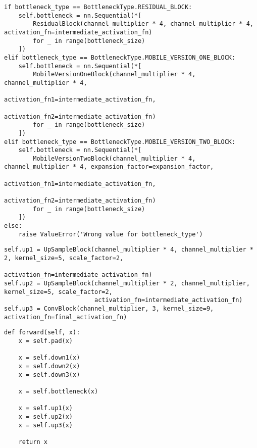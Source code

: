 \begin{listing}[ht]
\begin{verbatim}
if bottleneck_type == BottleneckType.RESIDUAL_BLOCK:
    self.bottleneck = nn.Sequential(*[
        ResidualBlock(channel_multiplier * 4, channel_multiplier * 4, activation_fn=intermediate_activation_fn)
        for _ in range(bottleneck_size)
    ])
elif bottleneck_type == BottleneckType.MOBILE_VERSION_ONE_BLOCK:
    self.bottleneck = nn.Sequential(*[
        MobileVersionOneBlock(channel_multiplier * 4, channel_multiplier * 4,
                              activation_fn1=intermediate_activation_fn,
                              activation_fn2=intermediate_activation_fn)
        for _ in range(bottleneck_size)
    ])
elif bottleneck_type == BottleneckType.MOBILE_VERSION_TWO_BLOCK:
    self.bottleneck = nn.Sequential(*[
        MobileVersionTwoBlock(channel_multiplier * 4, channel_multiplier * 4, expansion_factor=expansion_factor,
                              activation_fn1=intermediate_activation_fn,
                              activation_fn2=intermediate_activation_fn)
        for _ in range(bottleneck_size)
    ])
else:
    raise ValueError('Wrong value for bottleneck_type')
\end{verbatim}
\label{lst:transformer_net_full_2}
\end{listing}

\begin{listing}[ht]
\begin{verbatim}
self.up1 = UpSampleBlock(channel_multiplier * 4, channel_multiplier * 2, kernel_size=5, scale_factor=2,
                                 activation_fn=intermediate_activation_fn)
self.up2 = UpSampleBlock(channel_multiplier * 2, channel_multiplier, kernel_size=5, scale_factor=2,
                         activation_fn=intermediate_activation_fn)
self.up3 = ConvBlock(channel_multiplier, 3, kernel_size=9, activation_fn=final_activation_fn)
\end{verbatim}
\label{lst:transformer_net_full_3}
\end{listing}

\pagebreak

\begin{listing}[ht]
\begin{verbatim}
def forward(self, x):
    x = self.pad(x)

    x = self.down1(x)
    x = self.down2(x)
    x = self.down3(x)

    x = self.bottleneck(x)

    x = self.up1(x)
    x = self.up2(x)
    x = self.up3(x)

    return x
\end{verbatim}
\label{lst:transformer_net_full_4}
\end{listing}